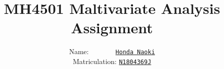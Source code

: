 \documentclass[12pt]{article}
\newenvironment{question}[2][Question]{\begin{trivlist}
\item[\hskip \labelsep {\bfseries #1}\hskip \labelsep {\bfseries #2.}]}{\end{trivlist}}
\begin{document}
 
 
 
\title{MH4501 Maltivariate Analysis\\
\Large Assignment}
\author{Name: \ \ \ \ \ \ \  \underline{\texttt{Honda Naoki}}\\ 
Matriculation: \underline{\texttt{N1804369J}}} 

\maketitle

\begin{question}{1}
\end{question}
\end{document}
